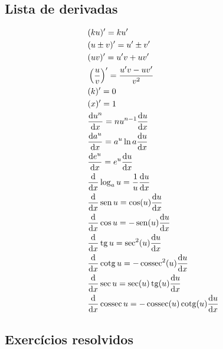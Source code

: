 \subsection{Lista de derivadas}

\begin{align}
  & (ku)' = ku' \\
  & (u\pm v)' = u' \pm v'\\
  & (uv)' = u'v + uv' \\
  & \left(\frac{u}{v}\right)' = \frac{u'v - uv'}{v^2} \\
  & (k)' = 0 \\
  & (x)' = 1 \\
  & \frac{\mathrm{d} u^n}{\mathrm{d} x} = nu^{n-1}\frac{\mathrm{d} u}{\mathrm{d} x}\\
  & \frac{\mathrm{d} a^u}{\mathrm{d} x} = a^u\ln a\frac{\mathrm{d} u}{\mathrm{d} x} \\
  & \frac{\mathrm{d} e^u}{\mathrm{d} x} = e^u\frac{\mathrm{d} u}{\mathrm{d} x} \\
  & \frac{\mathrm{d}}{\mathrm{d} x}\log_a u = \frac{1}{u}\frac{\mathrm{d} u}{\mathrm{d} x}\\
  & \frac{\mathrm{d}}{\mathrm{d} x}\operatorname{sen} u = \cos(u)\frac{\mathrm{d} u}{\mathrm{d} x} \\
  & \frac{\mathrm{d}}{\mathrm{d} x}\cos u = - \operatorname{sen}(u)\frac{\mathrm{d} u}{\mathrm{d} x}\\
  & \frac{\mathrm{d}}{\mathrm{d} x}\operatorname{tg} u = \sec^2(u)\frac{\mathrm{d} u}{\mathrm{d} x} \\
  & \frac{\mathrm{d}}{\mathrm{d} x}\operatorname{cotg} u = -\operatorname{cossec}^2(u)\frac{\mathrm{d} u}{\mathrm{d} x} \\
  & \frac{\mathrm{d}}{\mathrm{d} x}\sec u = \sec(u)\operatorname{tg}(u)\frac{\mathrm{d} u}{\mathrm{d} x} \\
  & \frac{\mathrm{d}}{\mathrm{d} x}\operatorname{cossec} u = -\operatorname{cossec}(u)\operatorname{cotg}(u)\frac{\mathrm{d} u}{\mathrm{d} x}
\end{align}

\subsection{Exercícios resolvidos}

